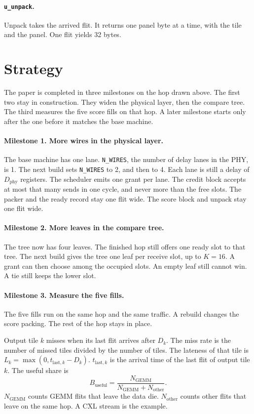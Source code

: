 \documentclass[11pt,a4paper]{article}
\begin{document}
\paragraph{\texttt{u\_unpack}.}
Unpack takes the arrived flit.
It returns one panel byte at a time, with the tile and the panel.
One flit yields 32 bytes.
\figunpack

\section{Strategy}
The paper is completed in three milestones on the hop drawn above.
The first two stay in construction.
They widen the physical layer, then the compare tree.
The third measures the five score fills on that hop.
A later milestone starts only after the one before it matches the base machine.

\paragraph{Milestone 1. More wires in the physical layer.}
The base machine has one lane.
\texttt{N\_WIRES}, the number of delay lanes in the PHY, is 1.
The next build sets \texttt{N\_WIRES} to 2, and then to 4.
Each lane is still a delay of $D_{\mathrm{phy}}$ registers.
The scheduler emits one grant per lane.
The credit block accepts at most that many sends in one cycle, and never more than the free slots.
The packer and the ready record stay one flit wide.
The score block and unpack stay one flit wide.

\paragraph{Milestone 2. More leaves in the compare tree.}
The tree now has four leaves.
The finished hop still offers one ready slot to that tree.
The next build gives the tree one leaf per receive slot, up to $K = 16$.
A grant can then choose among the occupied slots.
An empty leaf still cannot win.
A tie still keeps the lower slot.

\paragraph{Milestone 3. Measure the five fills.}
The five fills run on the same hop and the same traffic.
A rebuild changes the score packing.
The rest of the hop stays in place.

Output tile $k$ misses when its last flit arrives after $D_k$.
The miss rate is the number of missed tiles divided by the number of tiles.
The lateness of that tile is $L_k = \max(0, t_{\mathrm{last},k} - D_k)$.
$t_{\mathrm{last},k}$ is the arrival time of the last flit of output tile $k$.
The useful share is
\[
B_{\mathrm{useful}} = \frac{N_{\mathrm{GEMM}}}{N_{\mathrm{GEMM}} + N_{\mathrm{other}}}.
\]
$N_{\mathrm{GEMM}}$ counts GEMM flits that leave the data die.
$N_{\mathrm{other}}$ counts other flits that leave on the same hop.
A CXL stream is the example.
\end{document}

